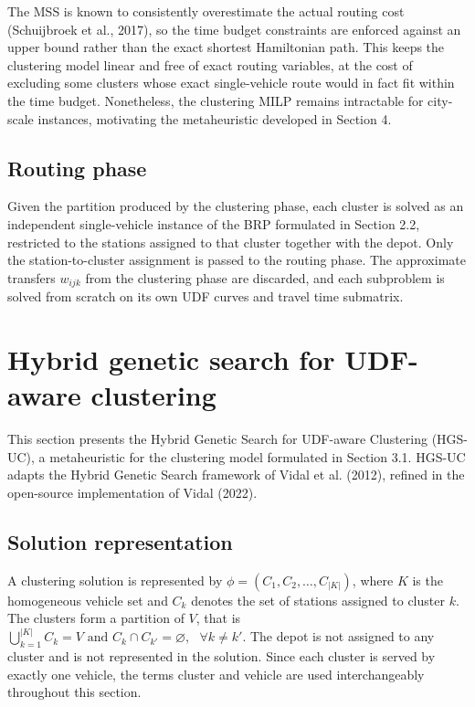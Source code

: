 \documentclass[11pt]{article}
\numberwithin{table}{section}
\numberwithin{figure}{section}
\begin{document}
The MSS is known to consistently overestimate the actual routing cost (Schuijbroek et al., 2017), so the time budget constraints  are enforced against an upper bound rather than the exact shortest Hamiltonian path. This keeps the clustering model linear and free of exact routing variables, at the cost of excluding some clusters whose exact single-vehicle route would in fact fit within the time budget. Nonetheless, the clustering MILP remains intractable for city-scale instances, motivating the metaheuristic developed in Section 4.

\subsection{Routing phase}

Given the partition produced by the clustering phase, each cluster is solved as an independent single-vehicle instance of the BRP formulated in Section 2.2, restricted to the stations assigned to that cluster together with the depot. Only the station-to-cluster assignment is passed to the routing phase. The approximate transfers $w_{ijk}$ from the clustering phase are discarded, and each subproblem is solved from scratch on its own UDF curves and travel time submatrix.

\section{Hybrid genetic search for UDF-aware clustering}

This section presents the Hybrid Genetic Search for UDF-aware Clustering (HGS-UC), a metaheuristic for the clustering model formulated in Section 3.1. HGS-UC adapts the Hybrid Genetic Search framework of Vidal et al. (2012), refined in the open-source implementation of Vidal (2022).

\subsection{Solution representation}

A clustering solution is represented by $\phi =({{C}_{1}},{{C}_{2}},\ldots ,{{C}_{\left| K \right|}})$, where $K$ is the homogeneous vehicle set and ${{C}_{k}}$ denotes the set of stations assigned to cluster $k$. The clusters form a partition of $V$, that is $\bigcup\limits_{k=1}^{\left| K \right|}{{{C}_{k}}}=V\text{ and }{{C}_{k}}\cap {{C}_{{{k}'}}}=\varnothing ,\text{ }\forall k\ne {k}'.$ The depot is not assigned to any cluster and is not represented in the solution. Since each cluster is served by exactly one vehicle, the terms cluster and vehicle are used interchangeably throughout this section.
\end{document}
